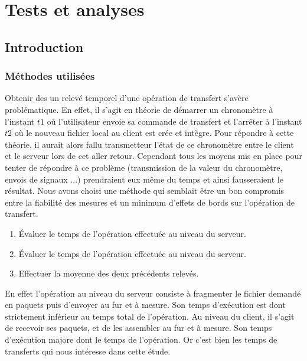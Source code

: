 
\chapter{Tests et analyses}
\section{Introduction}
\subsection{Méthodes utilisées}
Obtenir des un relevé temporel d'une opération de transfert s'avère problématique. En effet, il s'agit en théorie de démarrer un chronomètre  à l'instant $t1$ où l'utilisateur envoie sa commande de transfert et l'arrêter à l'instant $t2$ où le nouveau fichier local au client est crée et intègre. Pour répondre à cette théorie, il aurait alors fallu transmetteur l'état de ce chronomètre entre le client et le serveur lors de cet aller retour. Cependant tous les moyens mis en place pour tenter de répondre à ce problème (transmission de la valeur du chronomètre, envois de signaux ...) prendraient eux même du temps et ainsi fausseraient le résultat. Nous avons choisi une méthode qui semblait être un bon compromis entre la fiabilité des mesures et un minimum d'effets de bords sur l'opération de transfert.

\begin{enumerate}
\item Évaluer le temps de l'opération effectuée au niveau du serveur. 
\item Évaluer le temps de l'opération effectuée au niveau du serveur.
\item Effectuer la moyenne des deux précédents relevés.
\end{enumerate}
En effet l'opération au niveau du serveur consiste à fragmenter le fichier demandé en paquets puis d'envoyer au fur et à mesure. Son temps d'exécution est dont strictement inférieur au temps total de l'opération. 
Au niveau du client, il s'agit de recevoir ses paquets, et de les assembler au fur et à mesure. Son temps d'exécution majore dont le temps de l'opération. Or c'est bien les temps de transferts qui nous intéresse dans cette étude.
 

